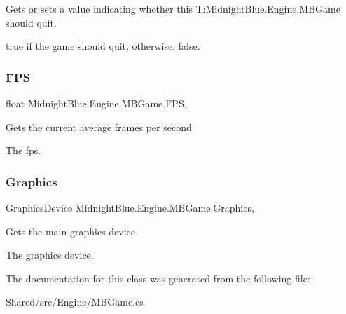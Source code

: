Gets or sets a value indicating whether this T\+:\+Midnight\+Blue.\+Engine.\+M\+B\+Game should quit. 

{\ttfamily true} if the game should quit; otherwise, {\ttfamily false}.\hypertarget{class_midnight_blue_1_1_engine_1_1_m_b_game_a6385d036d9230a1e08f669b340951e55}{}\label{class_midnight_blue_1_1_engine_1_1_m_b_game_a6385d036d9230a1e08f669b340951e55} 
\subsubsection{\texorpdfstring{F\+PS}{FPS}}
{\footnotesize\ttfamily float Midnight\+Blue.\+Engine.\+M\+B\+Game.\+F\+PS\hspace{0.3cm}{\ttfamily [static]}, {\ttfamily [get]}}



Gets the current average frames per second 

The fps.\hypertarget{class_midnight_blue_1_1_engine_1_1_m_b_game_a634a292296cdc4df062c0769d76e21b1}{}\label{class_midnight_blue_1_1_engine_1_1_m_b_game_a634a292296cdc4df062c0769d76e21b1} 
\subsubsection{\texorpdfstring{Graphics}{Graphics}}
{\footnotesize\ttfamily Graphics\+Device Midnight\+Blue.\+Engine.\+M\+B\+Game.\+Graphics\hspace{0.3cm}{\ttfamily [static]}, {\ttfamily [get]}}



Gets the main graphics device. 

The graphics device.

The documentation for this class was generated from the following file\+:\begin{DoxyCompactItemize}
\item 
Shared/src/\+Engine/M\+B\+Game.\+cs\end{DoxyCompactItemize}
